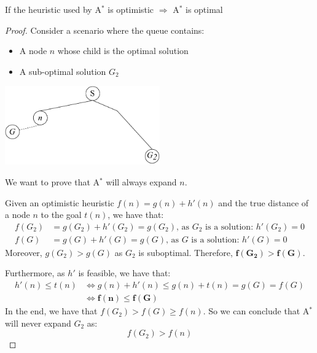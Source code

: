 \begin{description}
        \begin{theorem}
            If the heuristic used by A${^*}$ is optimistic $\Rightarrow$ A${^*}$ is optimal
        \end{theorem}
        \begin{proof}
            Consider a scenario where the queue contains:
            \begin{itemize}
                \item A node $n$ whose child is the optimal solution
                \item A sub-optimal solution $G_2$
            \end{itemize}
            \begin{center}
                \includegraphics[width=0.5\textwidth]{img/_a_start_optimality.pdf}
            \end{center}
            We want to prove that A$^*$ will always expand $n$.

            Given an optimistic heuristic $f(n) = g(n) + h'(n)$ and
            the true distance of a node $n$ to the goal $t(n)$,
            we have that:
            \[
                \begin{split}
                    f(G_2) &= g(G_2) + h'(G_2) = g(G_2) \text{, as } G_2 \text{ is a solution: } h'(G_2)=0 \\
                    f(G) &= g(G) + h'(G) = g(G) \text{, as } G \text{ is a solution: } h'(G)=0
                \end{split}
            \]
            Moreover, $g(G_2) > g(G)$ as $G_2$ is suboptimal.
            Therefore, $\bm{f(G_2) > f(G)}$.

            Furthermore, as $h'$ is feasible, we have that:
            \[
                \begin{split}
                    h'(n) \leq t(n) &\iff g(n) + h'(n) \leq g(n) + t(n) = g(G)=f(G) \\
                        &\iff \bm{f(n) \leq f(G)}
                \end{split}  
            \]
            In the end, we have that $f(G_2) > f(G) \geq f(n)$.
            So we can conclude that A$^*$ will never expand $G_2$ as:
            \[ f(G_2) > f(n) \] 
        \end{proof}


\end{description}
